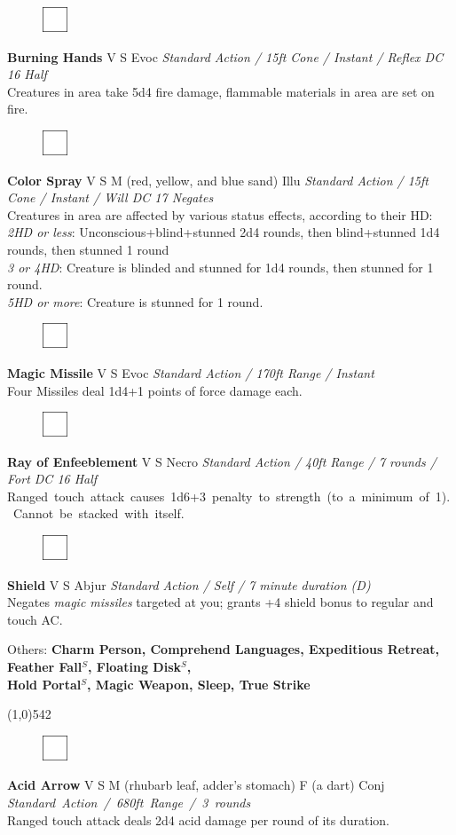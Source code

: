 \documentclass[letterpaper]{article}
\newcommand{\fullline}{\noindent\line(1,0){542} \\}
\newcommand{\e}[1]{\emph{#1}}
\newcommand{\B}[1]{\textbf{#1}}
\newcommand{\spell}[7]{
\begin{figure}
\vspace{-13pt}
\ifstrequal{#2}{Full}{  \includegraphics[width=2em]{Checkbox-Full}}{
\ifstrequal{#2}{Scroll}{\includegraphics[width=2em]{Checkbox-S}}{
                        \includegraphics[width=2em]{Checkbox}}}
\ifstrequal{#7}{}{\vspace{-1em}}{\vspace{#7}}
\end{figure}
\noindent \B{#1} #3 {
    \ifstrequal{#4}{Conj}{\color{Plum}Conj}{%
    \ifstrequal{#4}{Divin}{\color{YellowOrange}Divin}{%
    \ifstrequal{#4}{Ench}{\color{VioletRed}Ench}{%
    \ifstrequal{#4}{Trans}{\color{LimeGreen}Trans}{%
    \ifstrequal{#4}{Evoc}{\color{RedOrange}Evoc}{%
    \ifstrequal{#4}{Illu}{\color{ProcessBlue}Illu}{%
    \ifstrequal{#4}{Abjur}{\color{CadetBlue}Abjur}{%
    \ifstrequal{#4}{Necro}{\color{Red}Necro}{%
}}}}}}}}}
{\footnotesize \e{#5}} \\
#6
}
\newcommand{\s}[0]{$^S$}
\begin{document}
\spell{Burning Hands}{}{V S}{Evoc}{Standard Action / 15ft Cone / Instant / Reflex DC 16 Half}{%
Creatures in area take 5d4 fire damage, flammable materials in area are set on fire.}{}\\[-1em] %

\spell{Color Spray}{}{V S M (red, yellow, and blue sand)}{Illu}{Standard Action / 15ft Cone / Instant / Will DC 17 Negates}{%
Creatures in area are affected by various status effects, according to their HD:\\
\e{2HD or less}: Unconscious+blind+stunned 2d4 rounds, then blind+stunned 1d4 rounds, then stunned 1 round \\
\e{3 or 4HD}: Creature is blinded and stunned for 1d4 rounds, then stunned for 1 round.\\
\e{5HD or more}: Creature is stunned for 1 round.}{1em}

\spell{Magic Missile}{}{V S}{Evoc}{Standard Action / 170ft Range / Instant}{%
Four Missiles deal 1d4+1 points of force damage each.}{} \\[-1em] %

\spell{Ray of Enfeeblement}{}{V S}{Necro}{Standard Action / 40ft Range / 7 rounds / Fort DC 16 Half}{%
\mbox{Ranged touch attack causes 1d6+3 penalty to strength (to a minimum of 1).  Cannot be stacked with itself.}}{} \\[-1em] %

\spell{Shield}{}{V S}{Abjur}{Standard Action / Self / 7 minute duration (D)}{%
Negates \e{magic missiles} targeted at you; grants +4 shield bonus to regular and touch AC.}{}\\[-1em] %

\begin{adjustwidth}{3em}{0em}
Others: \B{Charm Person, Comprehend Languages, Expeditious Retreat, Feather Fall\s , Floating Disk\s ,\\ Hold Portal\s , Magic Weapon, Sleep, True Strike} \\[-2em]
\end{adjustwidth}

\fullline
\vspace{-1.25em}

\spell{Acid Arrow}{}{V S M (rhubarb leaf, adder's stomach) F (a dart)}{Conj}{\mbox{Standard Action / 680ft Range / 3 rounds}}{%
Ranged touch attack deals 2d4 acid damage per round of its duration.}{}\\[-1em] %
\end{document}
